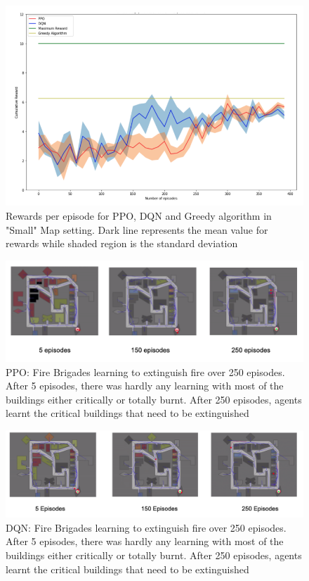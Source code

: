 \documentclass[12pt]{report}
\begin{document}
\begin{figure}[!h]
    \centering
    \includegraphics[width=16cm]{29.png}
    \caption{Rewards per episode for PPO, DQN and Greedy algorithm in "Small" Map setting. Dark line represents the mean value for rewards while shaded region is the standard deviation}
    \label{fig:SmallMapResults}
\end{figure}

\begin{figure}[!h]
    \centering
    \includegraphics[width=17cm]{PPO.png}
    \caption{PPO: Fire Brigades learning to extinguish fire over 250 episodes. After 5 episodes, there was hardly any learning with most of the buildings either critically or totally burnt. After 250 episodes, agents learnt the critical buildings that need to be extinguished}
    \label{fig:PPOLearningSmallMap}
\end{figure}

\begin{figure}[!h]
    \centering
    \includegraphics[width=17cm]{DQN.png}
    \caption{DQN: Fire Brigades learning to extinguish fire over 250 episodes. After 5 episodes, there was hardly any learning with most of the buildings either critically or totally burnt. After 250 episodes, agents learnt the critical buildings that need to be extinguished}
    \label{fig:DQNLearningSmallMap}
\end{figure}
\end{document}
